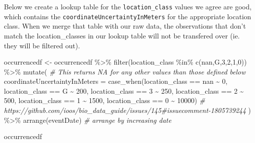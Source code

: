 \documentclass[
]{book}
\newenvironment{Shaded}{\begin{snugshade}}{\end{snugshade}}
\newcommand{\AttributeTok}[1]{\textcolor[rgb]{0.77,0.63,0.00}{#1}}
\newcommand{\CommentTok}[1]{\textcolor[rgb]{0.56,0.35,0.01}{\textit{#1}}}
\newcommand{\DecValTok}[1]{\textcolor[rgb]{0.00,0.00,0.81}{#1}}
\newcommand{\FunctionTok}[1]{\textcolor[rgb]{0.00,0.00,0.00}{#1}}
\newcommand{\NormalTok}[1]{#1}
\newcommand{\OtherTok}[1]{\textcolor[rgb]{0.56,0.35,0.01}{#1}}
\newcommand{\SpecialCharTok}[1]{\textcolor[rgb]{0.00,0.00,0.00}{#1}}
\newcommand{\StringTok}[1]{\textcolor[rgb]{0.31,0.60,0.02}{#1}}
\begin{document}
Below we create a lookup table for the \texttt{location\_class} values we agree are good, which contains the \texttt{coordinateUncertaintyInMeters} for the appropriate location class. When we merge that table with our raw data, the observations that don't match the location\_classes in our lookup table will not be transfered over (ie. they will be filtered out).

\begin{Shaded}
\begin{Highlighting}[]
\NormalTok{occurrencedf }\OtherTok{\textless{}{-}}\NormalTok{ occurrencedf }\SpecialCharTok{\%\textgreater{}\%}
    \FunctionTok{filter}\NormalTok{(location\_class }\SpecialCharTok{\%in\%} \FunctionTok{c}\NormalTok{(}\StringTok{\textquotesingle{}nan\textquotesingle{}}\NormalTok{,}\StringTok{\textquotesingle{}G\textquotesingle{}}\NormalTok{,}\StringTok{\textquotesingle{}3\textquotesingle{}}\NormalTok{,}\StringTok{\textquotesingle{}2\textquotesingle{}}\NormalTok{,}\StringTok{\textquotesingle{}1\textquotesingle{}}\NormalTok{,}\StringTok{\textquotesingle{}0\textquotesingle{}}\NormalTok{)) }\SpecialCharTok{\%\textgreater{}\%}
    \FunctionTok{mutate}\NormalTok{(  }\CommentTok{\# This returns NA for any other values than those defined below}
        \AttributeTok{coordinateUncertaintyInMeters =} \FunctionTok{case\_when}\NormalTok{(location\_class }\SpecialCharTok{==} \StringTok{\textquotesingle{}nan\textquotesingle{}} \SpecialCharTok{\textasciitilde{}} \DecValTok{0}\NormalTok{,}
\NormalTok{                                                     location\_class }\SpecialCharTok{==} \StringTok{\textquotesingle{}G\textquotesingle{}} \SpecialCharTok{\textasciitilde{}} \DecValTok{200}\NormalTok{,}
\NormalTok{                                                     location\_class }\SpecialCharTok{==} \StringTok{\textquotesingle{}3\textquotesingle{}} \SpecialCharTok{\textasciitilde{}} \DecValTok{250}\NormalTok{,}
\NormalTok{                                                     location\_class }\SpecialCharTok{==} \StringTok{\textquotesingle{}2\textquotesingle{}} \SpecialCharTok{\textasciitilde{}} \DecValTok{500}\NormalTok{,}
\NormalTok{                                                     location\_class }\SpecialCharTok{==} \StringTok{\textquotesingle{}1\textquotesingle{}} \SpecialCharTok{\textasciitilde{}} \DecValTok{1500}\NormalTok{,}
\NormalTok{                                                     location\_class }\SpecialCharTok{==} \StringTok{\textquotesingle{}0\textquotesingle{}} \SpecialCharTok{\textasciitilde{}} \DecValTok{10000}\NormalTok{) }\CommentTok{\# https://github.com/ioos/bio\_data\_guide/issues/145\#issuecomment{-}1805739244}
\NormalTok{          ) }\SpecialCharTok{\%\textgreater{}\%} 
    \FunctionTok{arrange}\NormalTok{(eventDate) }\CommentTok{\# arrange by increasing date}


\NormalTok{occurrencedf}
\end{Highlighting}
\end{Shaded}
\end{document}
